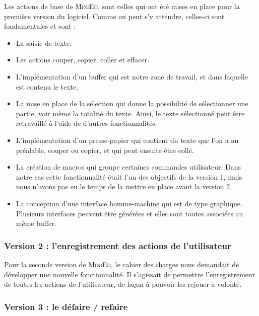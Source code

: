 \documentclass[a4paper]{article}
\begin{document}
			Les actions de base de \textsc{MiniEd}, sont celles qui ont été mises en place pour la première version du logiciel. Comme on peut s'y attendre, celles-ci sont fondamentales et sont :

			\begin{itemize}
				\item La saisie de texte.

				\item Les actions couper, copier, coller et effacer.

				\item L'implémentation d’un buffer qui est notre zone de travail, et dans laquelle est contenu le texte.

				\item La mise en place de la sélection qui donne la possibilité de sélectionner une partie, voir même la totalité du texte. Ainsi, le texte sélectionné peut être retravaillé à l’aide de d’autres fonctionnalités.

				\item L’implémentation d’un presse-papier qui contient du texte que l’on a au préalable, couper ou copier, et qui peut ensuite être collé.

				\item La création de macros qui groupe certaines commandes utilisateur. Dans notre cas cette fonctionnalité était l'un des objectifs de la version 1, mais nous n'avons pas eu le temps de la mettre en place avant la version 2.

				\item La conception d’une interface homme-machine qui est de type graphique. Plusieurs interfaces peuvent être générées et elles sont toutes associées au même buffer.
			\end{itemize}

			\subsubsection{Version 2 : l'enregistrement des actions de l'utilisateur}

			Pour la seconde version de \textsc{MiniEd}, le cahier des charges nous demandait de développer une nouvelle fonctionnalité. Il s'agissait de permettre l'enregistrement de toutes les actions de l'utilisateur, de façon à pouvoir les rejouer à volonté.

			\subsubsection{Version 3 : le défaire / refaire}
\end{document}
